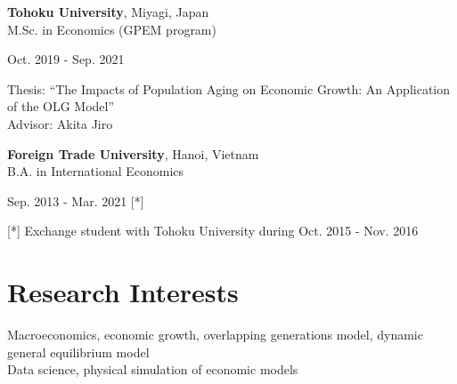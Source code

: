 \documentclass[a4paper,20pt]{article}
\begin{document}
	\begin{minipage}{.7\linewidth} \begin{flushleft}
			\textbf{Tohoku University}, Miyagi, Japan \\
			\hspace{4mm} M.Sc. in Economics (GPEM program)\\
	\end{flushleft} \end{minipage}
	\hfill 
	\begin{minipage}{.25\linewidth}\begin{flushright}
			Oct. 2019 - Sep. 2021 \\
	\end{flushright}\end{minipage}
	
	\vspace{2pt}
	\hspace{4mm} Thesis: ``The Impacts of Population Aging on Economic Growth: An Application of the OLG Model'' \\
	\hspace{4mm} Advisor: Akita Jiro
	\vspace{4pt}
	
	\begin{minipage}{.7\linewidth} \begin{flushleft}
			\textbf{Foreign Trade University}, Hanoi, Vietnam \\
			\hspace{4mm} B.A. in International Economics
	\end{flushleft} \end{minipage}
	\hfill 
	\begin{minipage}{.25\linewidth}\begin{flushright}
			Sep. 2013 - Mar. 2021 [*] \\
	\end{flushright}\end{minipage}
	
	\vspace{2pt}
	\hspace{4mm} [*] Exchange student with Tohoku University during Oct. 2015 - Nov. 2016
	
	\vspace{4pt}
	
	\vspace{0pt}
	\section{Research Interests}
	Macroeconomics, economic growth, overlapping generations model, dynamic general equilibrium model \\
	\vspace*{1pt}
	Data science, physical simulation of economic models
	
\end{document}
